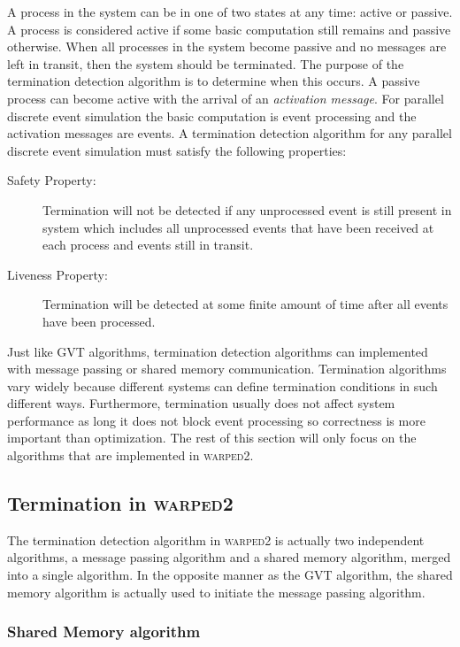 \documentclass[11pt]{book}
\begin{document}
A process in the system can be in one of two states at any time: active or passive.  A process
is considered active if some basic computation still remains and passive otherwise.
When all processes in the system become passive and no messages are left in transit, then
the system should be terminated.  The purpose of the termination detection algorithm is to
determine when this occurs.  A passive process can become active with the arrival of an
\emph{activation message}.  For parallel discrete event simulation the basic computation is
event processing and the activation messages are events.  A termination detection algorithm for
any parallel discrete event simulation must satisfy the following properties:

\begin{description}
    \item[Safety Property:] Termination will not be detected if any unprocessed event is still
        present in system which includes all unprocessed events that have been received at each
        process and events still in transit.
    \item[Liveness Property:] Termination will be detected at some finite amount of time after
        all events have been processed.
\end{description}

Just like GVT algorithms, termination detection algorithms can implemented with message
passing or shared memory communication.  Termination algorithms vary widely because different
systems can define termination conditions in such different ways.  Furthermore, termination
usually does not affect system performance as long it does not block event processing so
correctness is more important than optimization.  The rest of this section will only focus
on the algorithms that are implemented in \textsc{warped2}.

\subsection{Termination in \textsc{warped2}}

The termination detection algorithm in \textsc{warped2} is actually two independent algorithms,
a message passing algorithm and a shared memory algorithm, merged into a single algorithm.  In
the opposite manner as the GVT algorithm, the shared memory algorithm is actually used to initiate
the message passing algorithm.

\subsubsection{Shared Memory algorithm}
\end{document}
